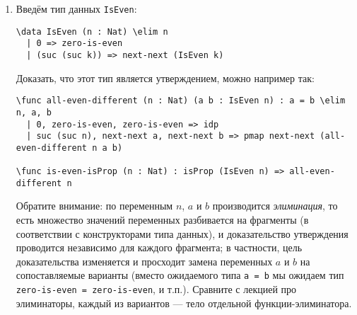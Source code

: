 \documentclass[10pt,a4paper,oneside]{article}
\begin{document}
\begin{enumerate}
Рассмотрим определения:
\begin{verbatim}
\func ChurchT (x : \Type) => (x -> x) -> (x -> x)
\func Church => \Pi (x : \Type) -> ChurchT x
\func Zero : Church => \lam t f x => x

\func incT (t : \Type) (n : ChurchT t) => \lam f x => n f (f x)
\func pair_plus (type : \Type) (pair : \Sigma (ChurchT type) (ChurchT type)) :
  \Sigma (ChurchT type) (ChurchT type) => (pair.2, incT type pair.2)
\func dec (n : Church) : Church => \lam (t : \Type) =>
    (n (\Sigma (ChurchT t) (ChurchT t)) (pair_plus t) (Zero t, Zero t)).1
\func sub (a : Church (\suc\lp)) (b : Church) => a (Church \lp) dec b
\end{verbatim}

Определите, развивая определения выше:
\begin{enumerate}
\item Операцию умножения.
\item Операцию <<деление на три>> (естественно, в версии, не использующей $Y$-комбинатор).
\item Операцию возведения в степень, определявшуюся как $\lambda m.\lambda n.n\ m$.
\item Деление.
\item Вычисление факториала.
\end{enumerate}

\item Введём тип данных \verb!IsEven!:

\begin{verbatim}
\data IsEven (n : Nat) \elim n
  | 0 => zero-is-even
  | (suc (suc k)) => next-next (IsEven k)
\end{verbatim}

Доказать, что этот тип является утверждением, можно например так:

\begin{verbatim}
\func all-even-different (n : Nat) (a b : IsEven n) : a = b \elim n, a, b
  | 0, zero-is-even, zero-is-even => idp
  | suc (suc n), next-next a, next-next b => pmap next-next (all-even-different n a b)

\func is-even-isProp (n : Nat) : isProp (IsEven n) => all-even-different n
\end{verbatim}

Обратите внимание: по переменным $n$, $a$ и $b$ производится \emph{элиминация}, то есть множество 
значений переменных разбивается на фрагменты (в соответствии с конструкторами типа данных), 
и доказательство утверждения проводится независимо для каждого фрагмента; 
в частности, цель доказательства изменяется и просходит замена переменных $a$ и $b$ на сопоставляемые
варианты (вместо ожидаемого типа \verb!a = b! мы ожидаем тип \verb!zero-is-even = zero-is-even!, и т.п.).
Сравните с лекцией про элиминаторы, каждый из вариантов --- тело отдельной функции-элиминатора. 


\end{enumerate}
\end{document}
